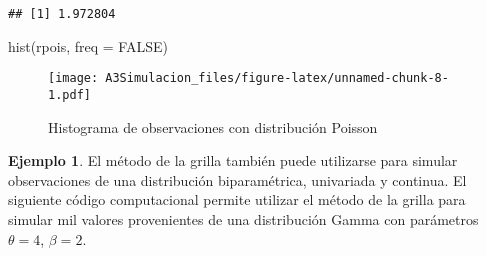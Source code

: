 \documentclass[
  spanish,
]{book}
\newenvironment{Shaded}{\begin{snugshade}}{\end{snugshade}}
\newcommand{\AttributeTok}[1]{\textcolor[rgb]{0.77,0.63,0.00}{#1}}
\newcommand{\ConstantTok}[1]{\textcolor[rgb]{0.00,0.00,0.00}{#1}}
\newcommand{\FunctionTok}[1]{\textcolor[rgb]{0.00,0.00,0.00}{#1}}
\newcommand{\NormalTok}[1]{#1}
\theoremstyle{definition}
\theoremstyle{definition}
\newtheorem{example}{Ejemplo}[chapter]
\theoremstyle{definition}
\theoremstyle{definition}
\theoremstyle{remark}
\begin{document}
\begin{verbatim}
## [1] 1.972804
\end{verbatim}

\begin{Shaded}
\begin{Highlighting}[]
\FunctionTok{hist}\NormalTok{(rpois, }\AttributeTok{freq =} \ConstantTok{FALSE}\NormalTok{)}
\end{Highlighting}
\end{Shaded}

\begin{figure}
\centering
\texttt{[image: A3Simulacion\_files/figure-latex/unnamed-chunk-8-1.pdf]}
\caption{\label{fig:unnamed-chunk-8}Histograma de observaciones con distribución Poisson}
\end{figure}

\begin{example}
\protect\hypertarget{exm:unnamed-chunk-9}{}{\label{exm:unnamed-chunk-9} }El método de la grilla también puede utilizarse para simular observaciones de una distribución biparamétrica, univariada y continua. El siguiente código computacional permite utilizar el método de la grilla para simular mil valores provenientes de una distribución Gamma con parámetros \(\theta = 4\), \(\beta = 2\).
\end{example}
\end{document}
